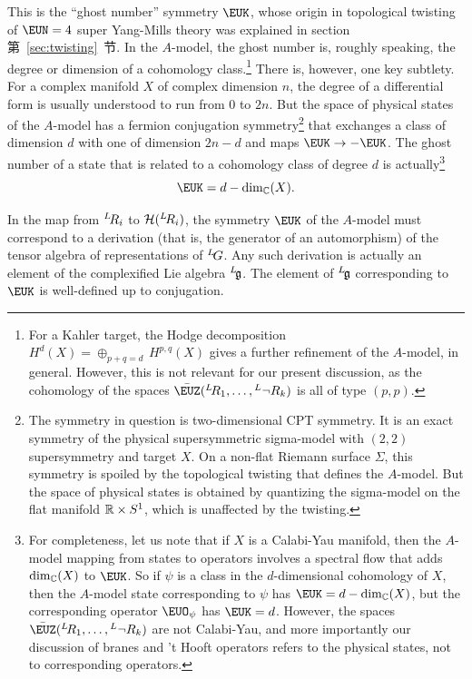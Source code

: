 This is the ``ghost number'' symmetry ${\EUK}$, whose origin in
topological twisting of ${\EUN}=4$ super Yang-Mills theory was
explained in section 第~\ref{sec:twisting}~节.  In the $A$-model, the ghost
number is, roughly speaking, the degree or dimension of a
cohomology class.\footnote{For a Kahler target, the Hodge
decomposition $H^d(X)=\oplus_{p+q=d}\,H^{p,q}(X)$ gives a further
refinement  of the $A$-model, in general. However, this is not
relevant for our present discussion, as the cohomology of the
spaces  $\bar \EUZ({}^L\negthinspace R_1,\dots,{}^L\neg R_k)$ is all of type $(p,p)$.}
There is, however, one key subtlety.  For a complex manifold $X$
of complex dimension $n$, the degree of a differential form is
usually understood to run from $0$ to $2n$. But the space of
physical states of the $A$-model has a fermion conjugation
symmetry\footnote{The symmetry in question is two-dimensional CPT
symmetry.  It is an exact symmetry of the physical supersymmetric
sigma-model with $(2,2)$ supersymmetry and target $X$. On a
non-flat Riemann surface $\Sigma$, this symmetry is spoiled by the
topological twisting that defines the $A$-model.  But the space of
physical states is obtained by quantizing the sigma-model on the
flat manifold $\Bbb{R}\times S^1$, which is unaffected by the
twisting.} that exchanges a class of dimension $d$ with one of
dimension $2n-d$ and maps ${\EUK}\to -{\EUK}$. The ghost number of
a state that is related to a cohomology class of degree $d$ is
actually\footnote{ For completeness, let us note that if $X$ is a
Calabi-Yau manifold, then the $A$-model mapping from states to
operators involves a spectral flow that adds $\dim_{\Bbb{C}}(X)$
to ${\EUK}$.  So if $\psi$ is a class in the $d$-dimensional
cohomology of $X$, then the $A$-model state corresponding to
$\psi$ has ${\EUK}=d-{\rm dim}_{\Bbb{C}}(X)$, but the
corresponding operator ${\EUO}_\psi$ has ${\EUK}=d$. However, the
spaces $\bar \EUZ({}^L\negthinspace R_1,\dots,{}^L\neg R_k)$ are not Calabi-Yau,
and more importantly our discussion of branes and 't Hooft
operators refers to the physical states, not to corresponding
operators.} %
\setcounter{equation}{27}
\begin{equation}\label{eq:insno}
{\EUK}=d-{\rm dim}_{\Bbb{C}}(X).
\end{equation}

In the map from $^L\negthinspace R_i$ to ${\cal H}(^L\negthinspace
R_i)$, the symmetry ${\EUK}$ of the $A$-model  must correspond to
a derivation (that is, the generator of an automorphism) of the
tensor algebra of representations of $^L\negthinspace G$. Any such
derivation is actually an element of the complexified Lie algebra
$^L\negthinspace \frak{g}$. The element of $^L\negthinspace
\frak{g}$ corresponding to ${\EUK}$ is well-defined up to
conjugation.

